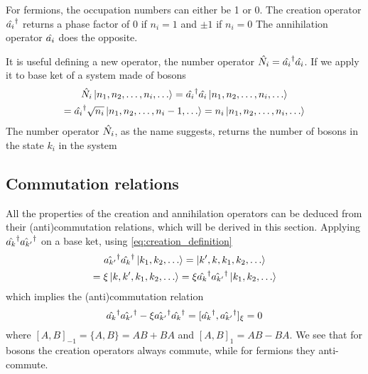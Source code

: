 
For fermions, the occupation numbers can either be 1 or 0. The creation operator $\hat{a_i}^\dagger$ returns a phase factor of 0 if $n_i=1$ and $\pm 1$ if $n_i=0$ The annihilation operator $\hat{a_i}$ does the opposite.

It is useful defining a new operator, the number operator $\hat{N_i} = \hat{a_i}^\dagger\hat{a_i}$. If we apply it to base ket of a system made of bosons
\begin{multline} \label{eq:number_operator}
    \hat{N_i} \ket{n_1, n_2, \dots, n_i, \dots}
    = \hat{a_i}^\dagger\hat{a_i} \ket{n_1, n_2, \dots, n_i, \dots}
    \\ = \hat{a_i}^\dagger \sqrt{n_i} \ket{n_1, n_2, \dots, n_i-1, \dots}
    = n_i \ket{n_1, n_2, \dots, n_i, \dots}
\end{multline}
The number operator $\hat{N_i}$, as the name suggests, returns the number of bosons in the state $k_i$ in the system

\subsection{Commutation relations}
All the properties of the creation and annihilation operators can be deduced from their (anti)commutation relations, which will be derived in this section. Applying $\hat{a_k}^\dagger\hat{a_{k'}}^\dagger$ on a base ket, using  \cref{eq:creation_definition}
\begin{multline}
    \hat{a_{k'}}^\dagger\hat{a_{k}}^\dagger \ket{k_1, k_2, \dots}
    = \ket{k',k,k_1, k_2, \dots}
    \\= \xi \ket{k,k',k_1, k_2, \dots}
    = \xi \hat{a_k}^\dagger\hat{a_{k'}}^\dagger\ket{k_1, k_2, \dots}
\end{multline}
which implies the (anti)commutation relation
\begin{equation}
    \hat{a_{k}}^\dagger\hat{a_{k'}}^\dagger - \xi \hat{a_{k'}}^\dagger\hat{a_{k}}^\dagger = [\hat{a_k}^\dagger, \hat{a_{k'}}^\dagger]_\xi = 0
\end{equation}
where $[A,B]_{-1} = \{A,B\} = AB+BA$ and $[A,B]_{1} = AB - BA$. We see that for bosons the creation operators always commute, while for fermions they anti-commute.

